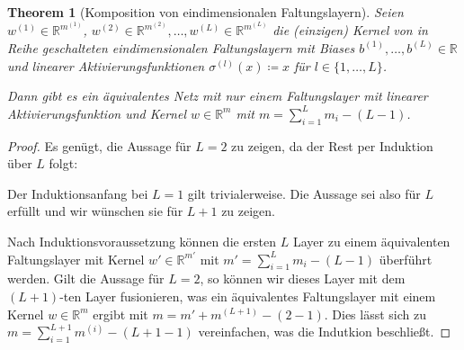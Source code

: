 \documentclass[paper=a4, 	%
		fontsize=11pt, 		%
		abstracton, 	%
		headsepline, 	%
		notitlepage	%
		]{scrartcl}
\newtheorem{theorem}{Theorem}[section]
\theoremstyle{definition}
\newcommand{\R}{\mathbb{R}}
\begin{document}
\begin{theorem}[Komposition von eindimensionalen Faltungslayern]\label{thm:matrix-collapse-linear-conv-layers}
    Seien $w^{(1)}\in\R^{m^{(1)}}$, $w^{(2)}\in\R^{m^{(2)}}, \dots, w^{(L)}\in\R^{m^{(L)}}$ die (einzigen) Kernel von in Reihe geschalteten eindimensionalen Faltungslayern mit Biases $b^{(1)},\dots, b^{(L)}\in\R$ und linearer Aktivierungsfunktionen $\sigma^{(l)}(x) \coloneqq x$ für $l\in\{1,\dots,L\}$.

    Dann gibt es ein äquivalentes Netz mit nur einem Faltungslayer mit linearer Aktivierungsfunktion und Kernel $w\in\R^m$ mit $m=\sum_{i=1}^L m_i - (L-1)$.
\end{theorem}
\begin{proof}
    Es genügt, die Aussage für $L=2$ zu zeigen, da der Rest per Induktion über $L$ folgt:

    Der Induktionsanfang bei $L=1$ gilt trivialerweise.
    Die Aussage sei also für $L$ erfüllt und wir wünschen sie für $L+1$ zu zeigen.
        
    Nach Induktionsvoraussetzung können die ersten $L$ Layer zu einem äquivalenten Faltungslayer mit Kernel $w'\in \R^{m'}$ mit $m'=\sum_{i=1}^L m_i - (L-1)$ überführt werden.
    Gilt die Aussage für $L=2$, so können wir dieses Layer mit dem $(L+1)$-ten Layer fusionieren, was ein äquivalentes Faltungslayer mit einem Kernel $w\in\R^m$ ergibt mit $m = m' + m^{(L+1)} - (2-1)$.
    Dies lässt sich zu $m = \sum_{i=1}^{L+1} m^{(i)} - (L+1 - 1) $ vereinfachen, was die Indutkion beschließt.
    

\end{proof}
\end{document}

